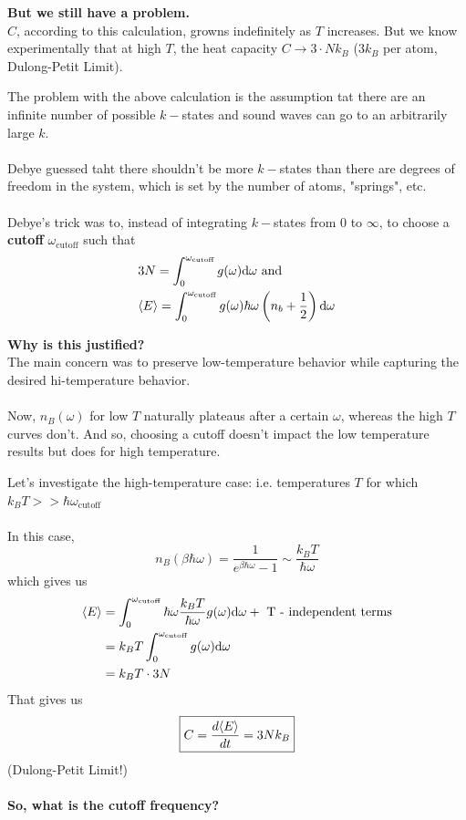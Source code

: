 \documentclass[11pt]{article}
\begin{document}
\begin{redbox}
  \textbf{But we still have a problem.} \\
  $C$, according to this calculation, growns indefinitely as $T$ increases. But we know experimentally that at high $T$, the heat capacity $C \rightarrow 3 \cdot Nk_B$ ($3k_B$ per atom, Dulong-Petit Limit).
\end{redbox}

The problem with the above calculation is the assumption tat there are an infinite number of possible $k-$states and sound waves can go to an arbitrarily large $k$.
\\
\\
Debye guessed taht there shouldn't be more $k-$states than there are degrees of freedom in the system, which is set by the number of atoms, "springs", etc.
\\
\\
Debye's trick was to, instead of integrating $k-$states from $0$ to $\infty$, to choose a \textbf{cutoff} $\omega_{\text{cutoff}}$ such that
\begin{align*}
  &3N = \int_0^{\omega_{\text{cutoff}}} g(\omega) \mathrm{d}\omega \text{ and } \\
  &\langle E \rangle = \int_0^{\omega_{\text{cutoff}}} g(\omega) \hbar \omega \left(n_b + \frac{1}{2} \right) \mathrm{d}\omega
\end{align*}

\begin{redbox}
  \textbf{Why is this justified?} \\
  The main concern was to preserve low-temperature behavior while capturing the desired hi-temperature behavior.
  \\
  \\
  Now, $n_B(\omega)$ for low $T$ naturally plateaus after a certain $\omega$, whereas the high $T$ curves don't. And so, choosing a cutoff doesn't impact the low temperature results but does for high temperature.
\end{redbox}

\vskip 0.5cm
Let's investigate the high-temperature case: i.e. temperatures $T$ for which $k_B T >> \hbar \omega_{\text{cutoff}}$
\\
\\
In this case, 
\[ n_B(\beta \hbar \omega) = \frac{1}{e^{\beta \hbar \omega} - 1} \sim \frac{k_B T}{\hbar \omega} \] which gives us 
\begin{align*}
  \langle E \rangle &= \int_0^{\omega_{\text{cutoff}}}  \hbar \omega \frac{k_B T}{\hbar \omega} g(\omega) \mathrm{d}\omega + \text{ T - independent terms}\\
  &= k_B T \int_0^{\omega_{\text{cutoff}}} g(\omega) \mathrm{d}\omega \\
  &= k_B T \cdot 3N 
\end{align*} That gives us \[\boxed{ C = \frac{d\langle E \rangle}{dt} = 3Nk_B} \] (Dulong-Petit Limit!)
\\
\\
\textbf{So, what is the cutoff frequency?}
\end{document}
